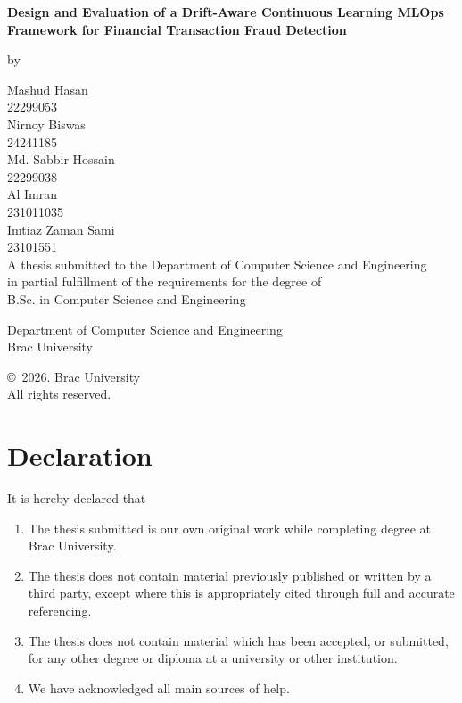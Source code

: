\documentclass[11pt,letterpaper]{report}
\begin{document}
\begin{titlepage}
\centering
\vspace*{1cm}
{\LARGE\bfseries Design and Evaluation of a Drift-Aware Continuous Learning MLOps Framework for Financial Transaction Fraud Detection\par}
\vspace{2em}
by\par\vspace{1.5em}
  Mashud Hasan\\ 22299053\\[0.7em]
  Nirnoy Biswas\\ 24241185\\[0.7em]
  Md. Sabbir Hossain\\ 22299038\\[0.7em]
  Al Imran\\ 231011035\\[0.7em]
  Imtiaz Zaman Sami\\ 23101551\\[0.7em]
\vfill
A thesis submitted to the Department of Computer Science and Engineering\\ in partial fulfillment of the requirements for the degree of\\ B.Sc. in Computer Science and Engineering\par
\vspace{2.5em}
Department of Computer Science and Engineering\\ Brac University\\ [Month Year]\par
\vfill
\copyright\ 2026. Brac University\\ All rights reserved.
\end{titlepage}

\chapter*{Declaration}
It is hereby declared that
\begin{enumerate}
  \item The thesis submitted is our own original work while completing degree at Brac University.
  \item The thesis does not contain material previously published or written by a third party, except where this is appropriately cited through full and accurate referencing.
  \item The thesis does not contain material which has been accepted, or submitted, for any other degree or diploma at a university or other institution.
  \item We have acknowledged all main sources of help.
\end{enumerate}
\end{document}
